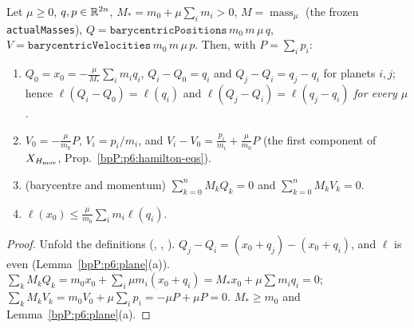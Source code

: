 \begin{lemma}\label{bpP:p6:bary-algebra}
Let $\mu\ge0$, $q,p\in\mathbb{R}^{2n}$, $M_*=m_0+\mu\sum_im_i>0$, $M=\operatorname{mass}_\mu$ (the frozen \texttt{actualMasses}), $Q=\texttt{barycentricPositions}\,m_0\,m\,\mu\,q$, $V=\texttt{barycentricVelocities}\,m_0\,m\,\mu\,p$. Then, with $P=\sum_ip_i$:
\begin{enumerate}[label=(\alph*)]
\item $Q_0=x_0=-\frac\mu{M_*}\sum_im_iq_i$, $Q_i-Q_0=q_i$ and $Q_j-Q_i=q_j-q_i$ for planets $i,j$; hence $\ell(Q_i-Q_0)=\ell(q_i)$ and $\ell(Q_j-Q_i)=\ell(q_j-q_i)$ \emph{for every $\mu$}.
\item $V_0=-\frac\mu{m_0}P$, $V_i=p_i/m_i$, and $V_i-V_0=\frac{p_i}{m_i}+\frac\mu{m_0}P$ (the first component of $X_{H_{\rm mov}}$, Prop.~\ref{bpP:p6:hamilton-eqs}).
\item (barycentre and momentum) $\sum_{k=0}^nM_kQ_k=0$ and $\sum_{k=0}^nM_kV_k=0$.
\item $\ell(x_0)\le\frac\mu{m_0}\sum_im_i\ell(q_i)$.
\end{enumerate}
\end{lemma}
\begin{proof}
\label{stepP:p6:ba-ab} Unfold the definitions (, , ). $Q_j-Q_i=(x_0+q_j)-(x_0+q_i)$, and $\ell$ is even (Lemma~\ref{bpP:p6:plane}(a)).
\label{stepP:p6:ba-c} $\sum_kM_kQ_k=m_0x_0+\sum_i\mu m_i(x_0+q_i)=M_*x_0+\mu\sum m_iq_i=0$; $\sum_kM_kV_k=m_0V_0+\mu\sum_ip_i=-\mu P+\mu P=0$.
\label{stepP:p6:ba-d} $M_*\ge m_0$ and Lemma~\ref{bpP:p6:plane}(a).
\end{proof}

